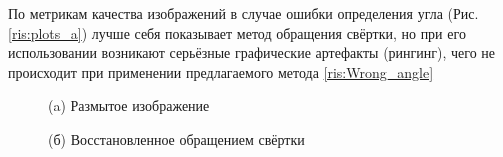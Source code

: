 По метрикам качества изображений в случае ошибки определения угла (Рис. \ref{ris:plots_a}) лучше себя показывает метод обращения свёртки, но при его использовании возникают серьёзные графические артефакты (рингинг), чего не происходит при применении предлагаемого метода \ref{ris:Wrong_angle}

\begin{figure}[H]
\begin{minipage}[t]{0.3\linewidth}
(a) Размытое изображение\\ 
\end{minipage}
\hfill
\begin{minipage}[t]{0.3\linewidth}
(б) Восстановленное обращением свёртки\\ 
\end{minipage}
\hfill
\begin{minipage}[t]{0.3\linewidth}

\end{minipage}
\end{figure}
